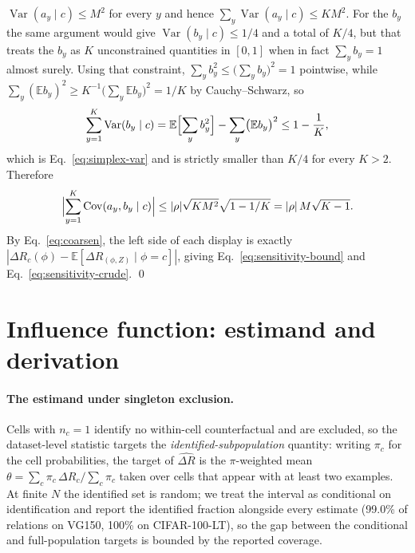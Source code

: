 $\operatorname{Var}(a_y\mid c)\le M^2$ for every $y$ and hence
$\sum_y\operatorname{Var}(a_y\mid c)\le KM^2$. For the $b_y$ the same argument would give
$\operatorname{Var}(b_y\mid c)\le1/4$ and a total of $K/4$, but that treats the $b_y$ as
$K$ unconstrained quantities in $[0,1]$ when in fact $\sum_yb_y=1$ almost surely. Using
that constraint, $\sum_yb_y^2\le\bigl(\sum_yb_y\bigr)^2=1$ pointwise, while
$\sum_y(\mathbb E b_y)^2\ge K^{-1}\bigl(\sum_y\mathbb E b_y\bigr)^2=1/K$ by
Cauchy--Schwarz, so
\[
\sum_{y=1}^K\operatorname{Var}(b_y\mid c)
=\mathbb E\Bigl[\sum_yb_y^2\Bigr]-\sum_y\bigl(\mathbb E b_y\bigr)^2\le1-\frac1K,
\]
which is Eq.~\eqref{eq:simplex-var} and is strictly smaller than $K/4$ for every $K>2$.
Therefore
\[
\Bigl|\sum_{y=1}^K\operatorname{Cov}(a_y,b_y\mid c)\Bigr|
\le|\rho|\sqrt{KM^2}\sqrt{1-1/K}=|\rho|\,M\sqrt{K-1}.
\]
By Eq.~\eqref{eq:coarsen}, the left side of each display is exactly
$|\Delta R_c(\phi)-\mathbb E[\Delta R_{(\phi,Z)}\mid\phi=c]|$, giving
Eq.~\eqref{eq:sensitivity-bound} and Eq.~\eqref{eq:sensitivity-crude}. \qed

\section{Influence function: estimand and derivation}\label{app:influence}

\paragraph{The estimand under singleton exclusion.} Cells with $n_c=1$ identify no
within-cell counterfactual and are excluded, so the dataset-level statistic targets the
\emph{identified-subpopulation} quantity: writing $\pi_c$ for the cell probabilities,
the target of $\widehat{\Delta R}$ is the $\pi$-weighted mean
$\theta=\sum_c\pi_c\,\Delta R_c/\sum_c\pi_c$ taken over cells that appear with at least
two examples. At finite $N$ the identified set is random; we treat the interval as
conditional on identification and report the identified fraction alongside every
estimate (99.0\% of relations on VG150, 100\% on CIFAR-100-LT), so the gap between the
conditional and full-population targets is bounded by the reported coverage.

